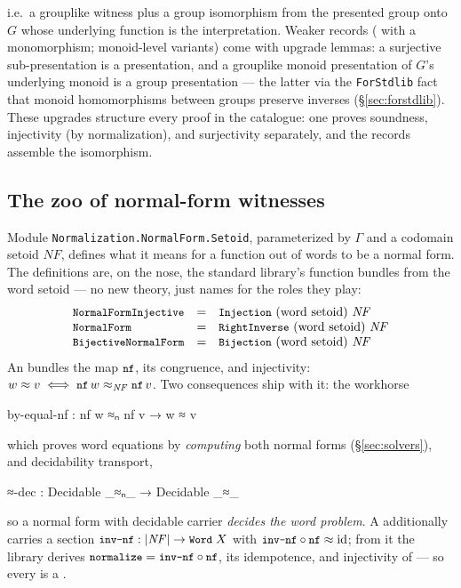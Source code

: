 i.e.\ a grouplike witness plus a group isomorphism from the presented
group onto $G$ whose underlying function is the interpretation.  Weaker
records ( with a monomorphism;
monoid-level variants) come with upgrade lemmas: a surjective
sub-presentation is a presentation, and a grouplike monoid presentation of
$G$'s underlying monoid is a group presentation --- the latter via the
\texttt{ForStdlib} fact that monoid homomorphisms between groups preserve
inverses (\S\ref{sec:forstdlib}).  These upgrades structure every proof in
the catalogue: one proves soundness, injectivity (by normalization), and
surjectivity separately, and the records assemble the isomorphism.

\subsection{The zoo of normal-form witnesses}\label{sec:nfproperty}

Module \texttt{Normalization.NormalForm.Setoid}, parameterized by $\Gamma$
and a codomain setoid $\mathit{NF}$, defines what it means for a function
out of words to be a normal form.  The definitions are, on the nose, the
standard library's function bundles from the word setoid --- no new
theory, just names for the roles they play:
\[
\begin{array}{lcl}
\mbox{\texttt{\small NormalFormInjective}} & = & \mbox{\texttt{\small Injection}}\ \text{(word setoid)}\ \mathit{NF} \\
\mbox{\texttt{\small NormalForm}}          & = & \mbox{\texttt{\small RightInverse}}\ \text{(word setoid)}\ \mathit{NF} \\
\mbox{\texttt{\small BijectiveNormalForm}} & = & \mbox{\texttt{\small Bijection}}\ \text{(word setoid)}\ \mathit{NF}
\end{array}
\]
An  bundles the map $\mbox{\texttt{\small nf}}$, its congruence, and
injectivity: $w \approx v \iff \mbox{\texttt{\small nf}}\,w \approx_{\mathit{NF}}
\mbox{\texttt{\small nf}}\,v$.  Two consequences ship with it: the workhorse
\begin{agdacode}
by-equal-nf : nf w ≈ₙ nf v → w ≈ v
\end{agdacode}
which proves word equations by \emph{computing} both normal forms
(\S\ref{sec:solvers}), and decidability transport,
\begin{agdacode}
≈-dec : Decidable _≈ₙ_ → Decidable _≈_
\end{agdacode}
so a normal form with decidable carrier \emph{decides the word problem}.
A  additionally carries a section
$\mbox{\texttt{\small inv-nf}} : |\mathit{NF}| \to \mbox{\texttt{\small Word}}\;X$ with
$\mbox{\texttt{\small inv-nf}} \circ \mbox{\texttt{\small nf}} \approx \mathrm{id}$; from it the library
derives $\mbox{\texttt{\small normalize}} = \mbox{\texttt{\small inv-nf}} \circ \mbox{\texttt{\small nf}}$, its idempotence,
and injectivity of  --- so every  is a
.

